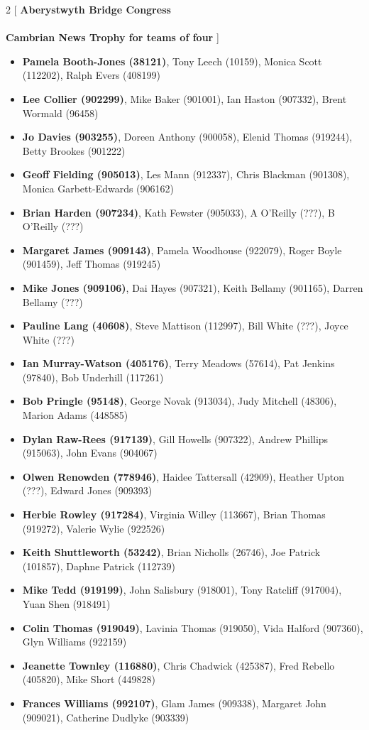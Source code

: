 \documentclass[11pt]{article}
\begin{document}
\begin{multicols}{2}
[
{\bf {\Large Aberystwyth Bridge Congress}}\\
\ \\
{\bf {\large Cambrian News Trophy for teams of four}}
]

\begin{itemize}
\item {\bf Pamela Booth-Jones (38121)},
Tony Leech (10159),
Monica Scott (112202),
Ralph Evers (408199)
\item {\bf Lee Collier (902299)},
Mike Baker (901001),
Ian Haston (907332),
Brent Wormald (96458)
\item {\bf Jo Davies (903255)},
Doreen Anthony (900058),
Elenid Thomas (919244),
Betty Brookes (901222)
\item {\bf Geoff Fielding (905013)},
Les Mann (912337),
Chris Blackman (901308),
Monica Garbett-Edwards (906162)
\item {\bf Brian Harden (907234)},
Kath Fewster (905033),
A O'Reilly (???),
B O'Reilly (???)
\item {\bf Margaret James (909143)},
Pamela Woodhouse (922079),
Roger Boyle (901459),
Jeff Thomas (919245)
\item {\bf Mike Jones (909106)},
Dai Hayes (907321),
Keith Bellamy (901165),
Darren Bellamy (???)
\item {\bf Pauline Lang (40608)},
Steve Mattison (112997),
Bill White (???),
Joyce White (???)
\item {\bf Ian Murray-Watson (405176)},
Terry Meadows (57614),
Pat Jenkins (97840),
Bob Underhill (117261)
\item {\bf Bob Pringle (95148)},
George Novak (913034),
Judy Mitchell (48306),
Marion Adams (448585)
\item {\bf Dylan Raw-Rees (917139)},
Gill Howells (907322),
Andrew Phillips (915063),
John Evans (904067)
\item {\bf Olwen Renowden (778946)},
Haidee Tattersall (42909),
Heather Upton (???),
Edward Jones (909393)
\item {\bf Herbie Rowley (917284)},
Virginia Willey (113667),
Brian Thomas (919272),
Valerie Wylie (922526)
\item {\bf Keith Shuttleworth (53242)},
Brian Nicholls (26746),
Joe Patrick (101857),
Daphne Patrick (112739)
\item {\bf Mike Tedd (919199)},
John Salisbury (918001),
Tony Ratcliff (917004),
Yuan Shen (918491)
\item {\bf Colin Thomas (919049)},
Lavinia Thomas (919050),
Vida Halford (907360),
Glyn Williams (922159)
\item {\bf Jeanette Townley (116880)},
Chris Chadwick (425387),
Fred Rebello (405820),
Mike Short (449828)
\item {\bf Frances Williams (992107)},
Glam James (909338),
Margaret John (909021),
Catherine Dudlyke (903339)

\end{itemize}

\end{multicols}
\end{document}
